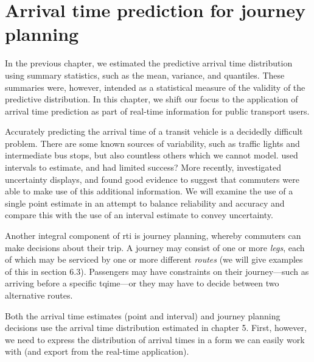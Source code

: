 
\chapter{Arrival time prediction for journey planning}
\label{cha:etas}

In the previous chapter, we estimated the predictive arrival time distribution using summary statistics, such as the mean, variance, and quantiles. These summaries were, however, intended as a statistical measure of the validity of the predictive distribution. In this chapter, we shift our focus to the application of arrival time prediction as part of real-time information for public transport users.

Accurately predicting the arrival time of a transit vehicle is a decidedly difficult problem. There are some known sources of variability, such as traffic lights and intermediate bus stops, but also countless others which we cannot model. \cite{cn} used intervals to estimate, and had limited success? More recently, \citet{cn} investigated uncertainty displays, and found good evidence to suggest that commuters were able to make use of this additional information. We will examine the use of a single point estimate in an attempt to balance reliability and accuracy and compare this with the use of an interval estimate to convey uncertainty.

Another integral component of \gls{rti} is journey planning, whereby commuters can make decisions about their trip. A journey may consist of one or more \emph{legs}, each of which may be serviced by one or more different \emph{routes} (we will give examples of this in section 6.3). Passengers may have constraints on their journey---such as arriving before a specific tqime---or they may have to decide between two alternative routes.

Both the arrival time estimates (point and interval) and journey planning decisions use the arrival time distribution estimated in chapter 5. First, however, we need to express the distribution of arrival times in a form we can easily work with (and export from the real-time application).







